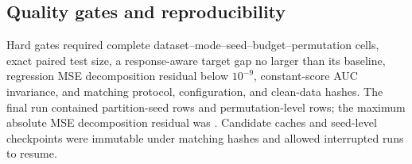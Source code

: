 \subsection{Quality gates and reproducibility}

Hard gates required complete dataset--mode--seed--budget--permutation cells, exact paired test size, a response-aware target gap no larger than its baseline, regression MSE decomposition residual below $10^{-9}$, constant-score AUC invariance, and matching protocol, configuration, and clean-data hashes. The final run contained \RawSeedRows{} partition-seed rows and \PermutationRows{} permutation-level rows; the maximum absolute MSE decomposition residual was \MaxMSEResidual{}. Candidate caches and seed-level checkpoints were immutable under matching hashes and allowed interrupted runs to resume.
